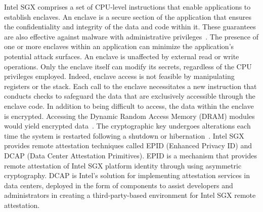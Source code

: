 \begin{newj}
Intel SGX comprises a set of CPU-level instructions that enable applications to establish enclaves. An enclave is a secure section of the application that ensures the confidentiality and integrity of the data and code within it. These guarantees are also effective against malware with administrative privileges~\cite{zheng2021survey}. The presence of one or more enclaves within an application can minimize the application’s potential attack surfaces. An enclave is unaffected by external read or write operations. Only the enclave itself can modify its secrets, regardless of the CPU privileges employed. Indeed, enclave access is not feasible by manipulating registers or the stack. Each call to the enclave necessitates a new instruction that conducts checks to safeguard the data that are exclusively accessible through the enclave code. In addition to being difficult to access, the data within the enclave is encrypted. Accessing the Dynamic Random Access Memory (DRAM) modules would yield encrypted data~\citep{jauernig2020trusted}. The cryptographic key undergoes alterations each time the system is restarted following a shutdown or hibernation~\citep{costan2016intel}. Intel SGX provides remote attestation techniques called EPID (Enhanced Privacy ID) and DCAP (Data Center Attestation Primitives). EPID is a mechanism that provides remote attestation of Intel SGX platform identity through using asymmetric cryptography. DCAP is Intel's solution for implementing attestation services in data centers, deployed in the form of components to assist developers and administrators in creating a third-party-based environment for Intel SGX remote attestation.

\end{newj}
